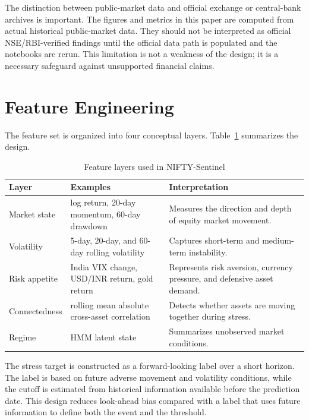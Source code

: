 \documentclass[12pt,a4paper]{article}
\begin{document}
The distinction between public-market data and official exchange or central-bank archives is important. The figures and metrics in this paper are computed from actual historical public-market data. They should not be interpreted as official NSE/RBI-verified findings until the official data path is populated and the notebooks are rerun. This limitation is not a weakness of the design; it is a necessary safeguard against unsupported financial claims.

\section{Feature Engineering}

The feature set is organized into four conceptual layers. Table~\ref{tab:feature_layers} summarizes the design.

\begin{table}[H]
\centering
\caption{Feature layers used in NIFTY-Sentinel}
\label{tab:feature_layers}
\begin{tabular}{p{} p{} p{}}
\toprule
\textbf{Layer} & \textbf{Examples} & \textbf{Interpretation} \\
\midrule
Market state & log return, 20-day momentum, 60-day drawdown & Measures the direction and depth of equity market movement. \\
Volatility & 5-day, 20-day, and 60-day rolling volatility & Captures short-term and medium-term instability. \\
Risk appetite & India VIX change, USD/INR return, gold return & Represents risk aversion, currency pressure, and defensive asset demand. \\
Connectedness & rolling mean absolute cross-asset correlation & Detects whether assets are moving together during stress. \\
Regime & HMM latent state & Summarizes unobserved market conditions. \\
\bottomrule
\end{tabular}
\end{table}

The stress target is constructed as a forward-looking label over a short horizon. The label is based on future adverse movement and volatility conditions, while the cutoff is estimated from historical information available before the prediction date. This design reduces look-ahead bias compared with a label that uses future information to define both the event and the threshold.
\end{document}
